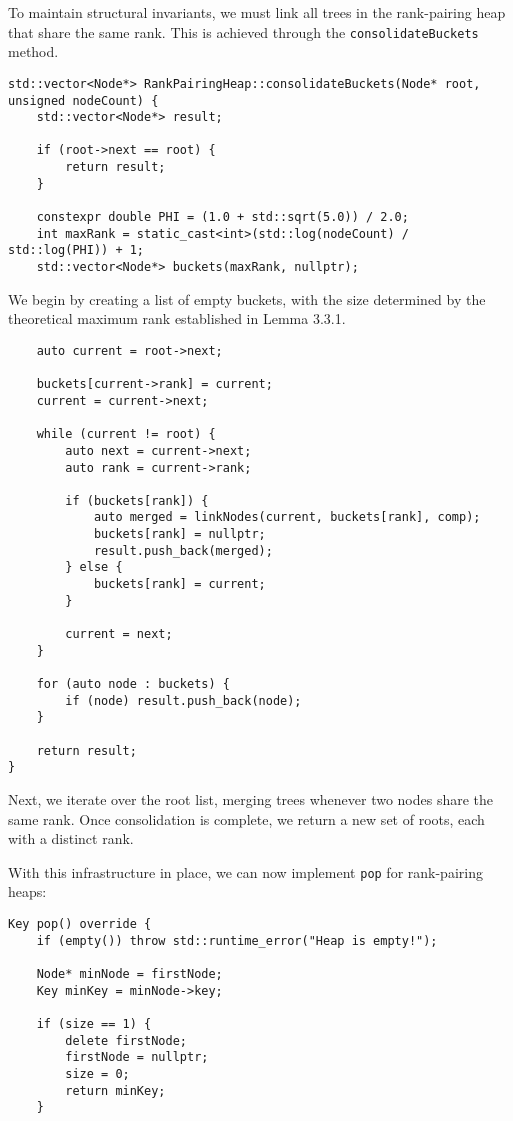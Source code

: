 To maintain structural invariants, we must link all trees in the rank-pairing heap that share the same rank. This is achieved through the \texttt{consolidateBuckets} method.

\begin{verbatim}
std::vector<Node*> RankPairingHeap::consolidateBuckets(Node* root, unsigned nodeCount) {
    std::vector<Node*> result;
    
    if (root->next == root) {
        return result;
    }
    
    constexpr double PHI = (1.0 + std::sqrt(5.0)) / 2.0;
    int maxRank = static_cast<int>(std::log(nodeCount) / std::log(PHI)) + 1;
    std::vector<Node*> buckets(maxRank, nullptr);
\end{verbatim}

We begin by creating a list of empty buckets, with the size determined by the theoretical maximum rank established in Lemma 3.3.1.

\begin{verbatim}
    auto current = root->next;
    
    buckets[current->rank] = current;
    current = current->next;
    
    while (current != root) {
        auto next = current->next;
        auto rank = current->rank;
        
        if (buckets[rank]) {
            auto merged = linkNodes(current, buckets[rank], comp);
            buckets[rank] = nullptr;
            result.push_back(merged);
        } else {
            buckets[rank] = current;
        }
        
        current = next;
    }
    
    for (auto node : buckets) {
        if (node) result.push_back(node);
    }
    
    return result;
}
\end{verbatim}

Next, we iterate over the root list, merging trees whenever two nodes share the same rank. Once consolidation is complete, we return a new set of roots, each with a distinct rank.

With this infrastructure in place, we can now implement \texttt{pop} for rank-pairing heaps:

\begin{verbatim}
Key pop() override {
    if (empty()) throw std::runtime_error("Heap is empty!");

    Node* minNode = firstNode;
    Key minKey = minNode->key;

    if (size == 1) {
        delete firstNode;
        firstNode = nullptr;
        size = 0;
        return minKey;
    }

\end{verbatim}

